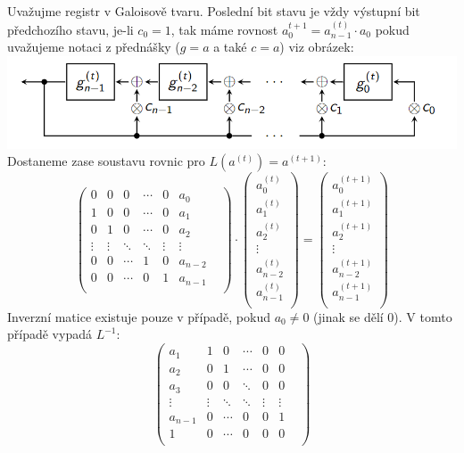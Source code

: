 \documentclass[12pt, a4paper]{article}
\begin{document}
\section{}
Uvažujme registr v Galoisově tvaru. Poslední bit stavu je vždy výstupní bit předchozího stavu, je-li $c_0 = 1$, tak máme rovnost $a_0^{t+1} = a_{n-1}^{(t)} \cdot a_0$ pokud uvažujeme notaci z přednášky ($g = a$ a také $c = a$) viz obrázek:
\includegraphics[width=\textwidth]{schema.png}
Dostaneme zase soustavu rovnic pro $L(a^{(t)}) = a^{(t+1)}$:
$$
\begin{pmatrix}
0 & 0 & 0 & \cdots & 0 & a_0\\
1 & 0 & 0 & \cdots & 0 & a_1\\
0 & 1 & 0 & \cdots & 0 & a_2 &\\
\vdots & \vdots & \ddots & \ddots & \vdots & \vdots \\
0 & 0 & \cdots & 1 & 0 & a_{n-2}\\
0 & 0 & \cdots & 0 & 1 & a_{n-1}\\
\end{pmatrix}
\cdot
\begin{pmatrix}
a_0^{(t)}\\
a_1^{(t)}\\
a_2^{(t)}\\
\vdots\\
a_{n-2}^{(t)}\\
a_{n-1}^{(t)}\\
\end{pmatrix}
=
\begin{pmatrix}
a_0^{(t+1)}\\
a_1^{(t+1)}\\
a_2^{(t+1)}\\
\vdots\\
a_{n-2}^{(t+1)}\\
a_{n-1}^{(t+1)}\\
\end{pmatrix}
$$
Inverzní matice existuje pouze v případě, pokud $a_0 \neq 0$ (jinak se dělí 0). V tomto případě vypadá $L^{-1}:$
$$
\begin{pmatrix}
a_1 & 1 & 0 & \cdots & 0 & 0\\
a_2 & 0 & 1 & \cdots & 0 & 0\\
a_3 & 0 & 0 & \ddots & 0 & 0 &\\
\vdots & \vdots & \ddots & \ddots & \vdots & \vdots \\
a_{n-1} & 0 & \cdots & 0 & 0 & 1\\
1 & 0 & \cdots & 0 & 0 & 0\\
\end{pmatrix}
$$
\end{document}
